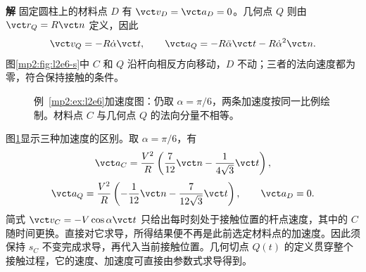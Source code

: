 \documentclass[11pt,openany,fontset=fandol]{ctexbook}
\theoremstyle{definition}\newtheorem{example}{例}[chapter]\newtheorem{exercise}{习题}[chapter]
\newcommand{\SolutionStart}{\par\medskip\ifdim\pagetotal>0pt\ifdim\dimexpr\pagegoal-\pagetotal\relax<3\baselineskip\newpage\fi\fi\noindent\textbf{解}\quad\ignorespaces}
\newenvironment{solution}{\SolutionStart}{\par\medskip}
\begin{document}
\begin{solution}
固定圆柱上的材料点 $D$ 有 $\vct v_D=\vct a_D=0$。几何点 $Q$ 则由 $\vct r_Q=R\vct n$ 定义，因此
\[
\vct v_Q=-R\dot\alpha\vct t,
\qquad
\vct a_Q=-R\ddot\alpha\vct t-R\dot\alpha^2\vct n.
\]
图\ref{mp2:fig:l2e6-s}中 $C$ 和 $Q$ 沿杆向相反方向移动，$D$ 不动；三者的法向速度都为零，符合保持接触的条件。

\begin{figure}[H]\centering
{}
\caption{例~\ref{mp2:ex:l2e6}加速度图：仍取 $\alpha=\pi/6$，两条加速度按同一比例绘制。材料点 $C$ 与几何点 $Q$ 的法向分量不相等。}\label{mp2:fig:l2e6-a}
\end{figure}

图\ref{mp2:fig:l2e6-a}显示三种加速度的区别。取 $\alpha=\pi/6$，有
\[
\vct a_C=\frac{V^2}{R}
\left(\frac7{12}\vct n-\frac1{4\sqrt3}\vct t\right),
\]
\[
\vct a_Q=\frac{V^2}{R}
\left(-\frac1{12}\vct n-\frac7{12\sqrt3}\vct t\right),
\qquad \vct a_D=0.
\]
简式 $\vct v_C=-V\cos\alpha\vct t$ 只给出每时刻处于接触位置的杆点速度，其中的 $C$ 随时间更换。直接对它求导，所得结果便不再是此前选定材料点的加速度。因此须保持 $s_C$ 不变完成求导，再代入当前接触位置。几何切点 $Q(t)$ 的定义贯穿整个接触过程，它的速度、加速度可直接由参数式求导得到。

\end{solution}
\end{document}
